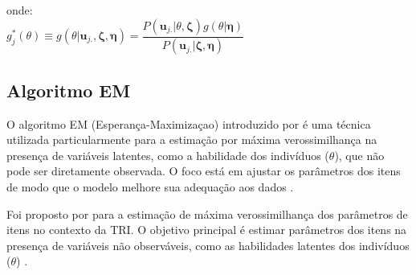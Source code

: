 onde:\\ 

\(
g^*_j(\theta) \equiv
g(\theta|\boldsymbol{u}_{j.}, \boldsymbol{\zeta}, \boldsymbol{\eta}) =
\dfrac{
	P(\boldsymbol{u}_{j.}|\theta,\boldsymbol{\zeta})g(\theta|\boldsymbol{\eta})
}{
	P(\boldsymbol{u}_{j.}|\boldsymbol{\zeta}, \boldsymbol{\eta})
}
\)



\subsection{Algoritmo EM}


O algoritmo EM (Esperança-Maximizaçao) introduzido por  é uma técnica utilizada particularmente para a estimação por máxima verossimilhança na presença de variáveis latentes, como a habilidade dos indivíduos ($\theta$), que não pode ser diretamente observada.  O foco está em ajustar os parâmetros dos itens de modo que o modelo melhore sua adequação aos dados \cite{de2000teoria}.

Foi proposto por  para a estimação de máxima verossimilhança dos parâmetros de itens no contexto da TRI. O objetivo principal é estimar parâmetros dos itens na presença de variáveis não observáveis, como as habilidades latentes dos indivíduos ($\theta$)  \cite{de2000teoria}.

